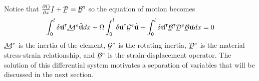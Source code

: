 Notice that $ \frac{\partial ()}{\partial x}\bunderline{I}+\bunderline{\mathcal{P}}=\bunderline{\mathcal{B}}^\T $ so the equation of motion becomes
\begin{equation}\label{eq:EquationOfMotionVirtual}
\int_0^l \delta\vec{\mathbf{u}}^\T\bunderline{\mathcal{M}}^e\ddot{\vec{\mathbf{u}}}dx+\Omega\int_0^l \delta\vec{\mathbf{u}}^\T\bunderline{\mathcal{G}}^e\dot{\vec{\mathbf{u}}}+\int_0^l\delta\vec{\mathbf{u}}^\T\bunderline{\mathcal{B}}^\T\bunderline{\mathcal{D}}^e\bunderline{\mathcal{B}}\vec{\mathbf{u}}dx=0
\end{equation}
$ \bunderline{\mathcal{M}}^e $ is the inertia of the element, $ \bunderline{\mathcal{G}}^e $ is the rotating inertia, $ \bunderline{\mathcal{D}}^e $ is the material stress-strain relationship, and $ \bunderline{\mathcal{B}}^e $ is the strain-displacement operator. The solution of this differential system motivates a separation of variables that will be discussed in the next section.
